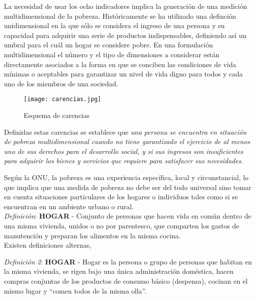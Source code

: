 La necesidad de usar los ocho indicadores implica la generación de una medición multidimensional de la pobreza. Históricamente se ha utilizado una definción unidimensional en la que sólo se considera el ingreso de una persona y su capacidad para adquirir una serie de productos indispensables, definiendo así un umbral para el cuál un hogar se considere pobre. En una formulación multidimensional el número y el tipo de dimensiones a considerar están directamente asociados a la forma en que se conciben las condiciones de vida mínimas o aceptables para garantizar un nivel de vida digno para todos y cada uno de los miembros de una sociedad.\\
\begin{figure}[H]
\centering
\texttt{[image: carencias.jpg]}
\caption{Esquema de carencias}
\label{fig:carencias}
\end{figure}
Definidas estas carencias se establece que \textit{una persona se encuentra en situación de pobreza multidimensional cuando no tiene garantizado el ejercicio de al menos uno de sus derechos para el desarrollo social, y si sus ingresos son insuficientes para adquirir los bienes y servicios que requiere para satisfacer sus necesidades}.

Según la ONU, la pobreza es una experiencia específica, local y circunstancial\cite{carencias}, lo que implica que una medida de pobreza no debe ser del todo universal sino tomar en cuenta situaciones particulares de los hogares o individuos tales como si se encuentran en un ambiente urbano o rural.\\

\textit{Definición}:\textbf{ HOGAR} - Conjunto de personas que hacen vida en común dentro de una misma vivienda, unidos o no por parentesco, que comparten los gastos de manutención y preparan los alimentos en la misma cocina.\\

Existen definiciones alternas,

\textit{Definición 2}: \textbf{HOGAR} - Hogar es la persona o grupo de personas que habitan en la misma vivienda, se rigen bajo una única administración doméstica, hacen compras conjuntas de los productos de consumo básico (despensa), cocinan en el mismo lugar y “comen todos de la misma olla”.

